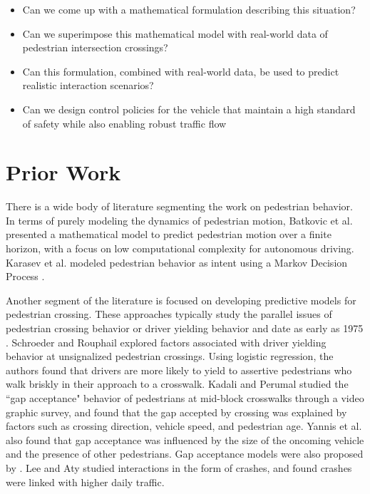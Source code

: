 \documentclass[11pt]{article}
\begin{document}
\begin{itemize}  
	\item Can we come up with a mathematical formulation describing this situation? 
	\item Can we superimpose this mathematical model with real-world data of pedestrian intersection crossings? 
	\item Can this formulation, combined with real-world data, be used to predict realistic 
	interaction scenarios?
	\item Can we design control policies for the vehicle that maintain a high standard of safety while also enabling robust traffic flow 
\end{itemize}


\section{Prior Work}

There is a wide body of literature segmenting the work on pedestrian behavior. In terms of purely modeling the dynamics of pedestrian motion, Batkovic et al. \cite{Batkovic} presented a mathematical model to predict pedestrian motion over a finite horizon, with a focus on low computational complexity for autonomous driving. Karasev et al. modeled pedestrian behavior as intent using a Markov Decision Process \cite{Karasev2016}. 

Another segment of the literature is focused on developing predictive models for pedestrian crossing. These approaches typically study the parallel issues of pedestrian crossing behavior or driver yielding behavior and date as early as 1975 \cite{Katz1975}. Schroeder and Rouphail \cite{Schroeder2011} explored factors associated with driver yielding behavior at unsignalized pedestrian crossings. Using logistic regression, the authors found that drivers are more likely to yield to assertive pedestrians who walk briskly in their approach to a crosswalk. Kadali and Perumal \cite{RaghuramKadali2012} studied the ``gap acceptance" behavior of pedestrians at mid-block crosswalks through a video graphic survey, and found that the gap accepted by crossing was explained by factors such as crossing direction, vehicle speed, and pedestrian age. Yannis et al. \cite{Yannis2013} also found that gap acceptance was influenced by the size of the oncoming vehicle and the presence of other pedestrians. Gap acceptance models were also proposed by \cite{Sun2002}. Lee and Aty \cite{Lee2005} studied interactions in the form of crashes, and found crashes were linked with higher daily traffic. 
\end{document}
